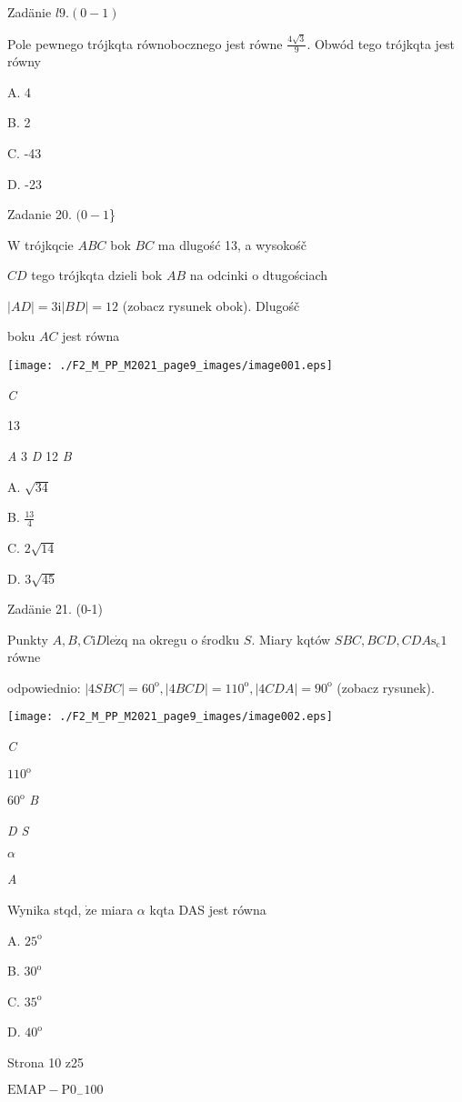 \documentclass[a4paper,12pt]{article}
\begin{document}
Zadänie $l9. (0-1)$

Pole pewnego trójkqta równobocznego jest równe $\displaystyle \frac{4\sqrt{3}}{9}$. Obwód tego trójkqta jest równy

A. 4

B. 2

C. -43

D. -23

Zadanie 20. $(0-1$\}

$\mathrm{W}$ trójkqcie $ABC$ bok $BC$ ma dlugość 13, a wysokośč

$CD$ tego trójkqta dzieli bok $AB$ na odcinki o dtugościach

$|AD|=3 \mathrm{i} |BD|=12$ (zobacz rysunek obok). Dlugośč

boku $AC$ jest równa
\begin{center}
\texttt{[image: ./F2\_M\_PP\_M2021\_page9\_images/image001.eps]}
\end{center}
{\it C}

13

{\it A} 3  {\it D}  12  {\it B}

A. $\sqrt{34}$

B. $\displaystyle \frac{13}{4}$

C. $2\sqrt{14}$

D. $3\sqrt{45}$

Zadänie 21. (0-1)

Punkty $A, B, C \mathrm{i} D \mathrm{l}\mathrm{e}\dot{\mathrm{z}}\mathrm{q}$ na okregu o środku $S$. Miary kqtów $SBC, BCD, CDA \mathrm{s}_{\mathrm{c}}1$ równe

odpowiednio: $|4SBC|=60^{\mathrm{o}}, |4BCD|=110^{\mathrm{o}}, |4CDA|=90^{\mathrm{o}}$ (zobacz rysunek).
\begin{center}
\texttt{[image: ./F2\_M\_PP\_M2021\_page9\_images/image002.eps]}
\end{center}
{\it C}

$110^{\mathrm{o}}$

$60^{\mathrm{o}}$  {\it B}

{\it D  S}

$\alpha$

{\it A}

Wynika stqd, $\dot{\mathrm{z}}\mathrm{e}$ miara $\alpha$ kqta DAS jest równa

A. $25^{\mathrm{o}}$

B. $30^{\mathrm{o}}$

C. $35^{\mathrm{o}}$

D. $40^{\mathrm{o}}$

Strona 10 z25

$\mathrm{E}\mathrm{M}\mathrm{A}\mathrm{P}-\mathrm{P}0_{-}100$
\end{document}
